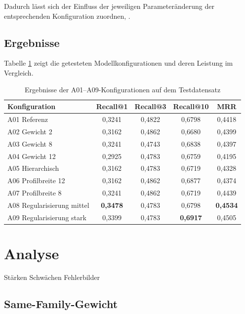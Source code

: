 Dadurch lässt sich der Einfluss der jeweiligen Parameteränderung der entsprechenden Konfiguration zuordnen, \parencite{LTR_Configuration_Test_Series}.

\subsection{Ergebnisse}

Tabelle \ref{tab:konfigurationsvergleich} zeigt die getesteten Modellkonfigurationen und deren Leistung im Vergleich.

\begin{table}[H] 
    \centering 
    \caption{Ergebnisse der A01--A09-Konfigurationen auf dem Testdatensatz} 
    \label{tab:konfigurationsvergleich} 
    \small 
    \begin{tabular}{lcccc} 
        \toprule 
        \textbf{Konfiguration} & \textbf{Recall@1} & \textbf{Recall@3} & \textbf{Recall@10} & \textbf{MRR} \\ 
        \midrule 
        A01 Referenz & 0,3241 & 0,4822 & 0,6798 & 0,4418 \\ 
        A02 Gewicht 2 & 0,3162 & 0,4862 & 0,6680 & 0,4399 \\ 
        A03 Gewicht 8 & 0,3241 & 0,4743 & 0,6838 & 0,4397 \\ 
        A04 Gewicht 12 & 0,2925 & 0,4783 & 0,6759 & 0,4195 \\ 
        A05 Hierarchisch & 0,3162 & 0,4783 & 0,6719 & 0,4328 \\ 
        A06 Profilbreite 12 & 0,3162 & 0,4862 & 0,6877 & 0,4374 \\ 
        A07 Profilbreite 8 & 0,3241 & 0,4862 & 0,6719 & 0,4439 \\ 
        A08 Regularisierung mittel & \textbf{0,3478} & 0,4783 & 0,6798 & \textbf{0,4534} \\ 
        A09 Regularisierung stark & 0,3399 & 0,4783 & \textbf{0,6917} & 0,4505 \\ 
        \bottomrule 
    \end{tabular} 
\end{table}



\section{Analyse}

Stärken
Schwächen
Fehlerbilder

\subsection{Same-Family-Gewicht}

